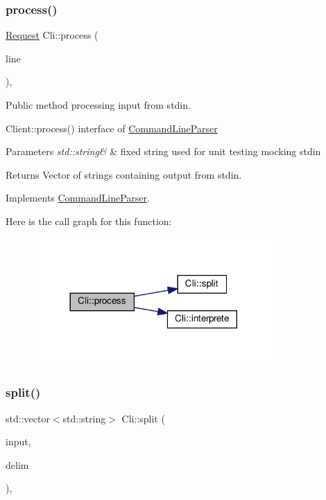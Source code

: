 \subsubsection{\texorpdfstring{process()}{process()}\hspace{0.1cm}{\footnotesize\ttfamily [2/2]}}
{\footnotesize\ttfamily \hyperlink{classRequest}{Request} Cli\+::process (\begin{DoxyParamCaption}\item[{std\+::string \&}]{line }\end{DoxyParamCaption})\hspace{0.3cm}{\ttfamily [override]}, {\ttfamily [virtual]}}



Public method processing input from stdin. 

Client\+::process() interface of \hyperlink{classCommandLineParser}{Command\+Line\+Parser} 
\begin{DoxyParams}{Parameters}
{\em std\+::string\&} & fixed string used for unit testing mocking stdin \\
\hline
\end{DoxyParams}
\begin{DoxyReturn}{Returns}
Vector of strings containing output from stdin. 
\end{DoxyReturn}


Implements \hyperlink{classCommandLineParser}{Command\+Line\+Parser}.

Here is the call graph for this function\+:\nopagebreak
\begin{figure}[H]
\begin{center}
\leavevmode
\includegraphics[width=260pt]{classCli_a4ee41556f8c3a736d813f0d937413da0_cgraph}
\end{center}
\end{figure}
\mbox{\label{classCli_aaf60768f062a6dc2557aaddbe738a19c}} 
\subsubsection{\texorpdfstring{split()}{split()}}
{\footnotesize\ttfamily std\+::vector$<$std\+::string$>$ Cli\+::split (\begin{DoxyParamCaption}\item[{std\+::string \&}]{input,  }\item[{char}]{delim }\end{DoxyParamCaption})\hspace{0.3cm}{\ttfamily [inline]}, {\ttfamily [private]}}

